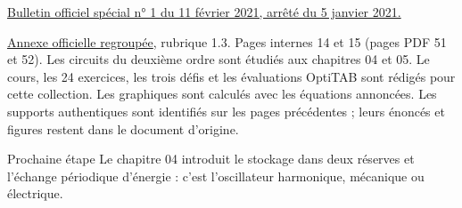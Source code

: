 \href{https://www.education.gouv.fr/bo/21/Special1/ESRS2035779A.htm}{Bulletin officiel spécial n° 1 du 11 février 2021, arrêté du 5 janvier 2021.}\par
\href{https://cache.media.education.gouv.fr/file/SPE1-MEN-MESRI-4-2-2021/64/8/spe779_annexe_1373648.pdf}{Annexe officielle regroupée}, rubrique 1.3. Pages internes 14 et 15 (pages PDF 51 et 52). Les circuits du deuxième ordre sont étudiés aux chapitres 04 et 05.
Le cours, les 24 exercices, les trois défis et les évaluations OptiTAB sont rédigés pour cette collection. Les graphiques sont calculés avec les équations annoncées. Les supports authentiques sont identifiés sur les pages précédentes ; leurs énoncés et figures restent dans le document d’origine.
\begin{methode}{Prochaine étape}
Le chapitre 04 introduit le stockage dans deux réserves et l’échange périodique d’énergie : c’est l’oscillateur harmonique, mécanique ou électrique.
\end{methode}

